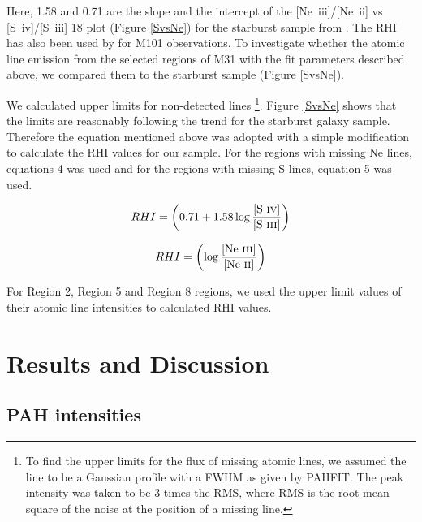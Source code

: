 \documentclass[useAMS,usenatbib,a4paper]{mn2e}
\begin{document}
	Here, 1.58 and 0.71 are the slope and the intercept of the [Ne~{\sc iii}]/[Ne~{\sc ii}]  vs [S~{\sc iv}]/[S~{\sc iii}] 18 plot (Figure \ref{SvsNe}) for the starburst sample from \citet{Engelbracht_2008}. The RHI has also been used by \citet{Gordon:2008lr} for M101 observations. To investigate whether the atomic line emission from the selected regions of M31 with the fit parameters described above, we compared them to the starburst sample (Figure \ref{SvsNe}). 
	
	We calculated upper limits for non-detected lines \footnote{To find the upper limits for the flux of missing atomic lines, we assumed the line to be a Gaussian profile with a FWHM as given by PAHFIT. The peak intensity was taken to be 3 times the RMS, where RMS is the root mean square of the noise at the position of a missing line.}. Figure \ref{SvsNe}  shows that the limits are reasonably following the trend for the starburst galaxy sample. Therefore the equation mentioned above was adopted with a simple modification to calculate the RHI values for our sample. For the regions with missing Ne lines, equations 4 was used and for the regions with missing S lines, equation 5 was used. 




\vspace{2 mm}	
\begin{equation}
RHI = \left(0.71 + 1.58\log\frac{\textrm{[S~{\sc iv}]}}{\textrm{[S~{\sc iii}]}}\right)
\vspace{1 mm}	
\end{equation}

\vspace{1 mm}	
\begin{equation}
RHI = \left(\log\frac{\textrm{[Ne~{\sc iii}]}}{\textrm{[Ne~{\sc ii}]}}\right)
\vspace{5 mm}	
\end{equation}
		
		For Region 2, Region 5 and Region 8 regions, we used the upper limit values of their atomic line intensities to calculated RHI values.
	


\section{Results and Discussion}


\subsection{PAH intensities}
\end{document}
